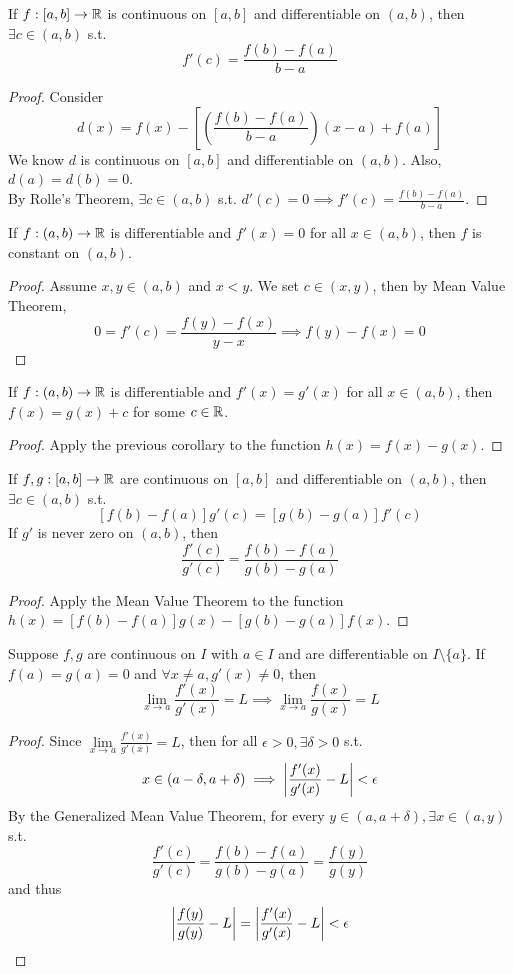 \documentclass[11pt]{article}
\begin{document}
 If $f: [a,b] \rightarrow \mathbb{R}$ is continuous on $[a,b]$ and differentiable on $(a,b)$, then $\exists c \in (a,b)$ s.t.
$$f'(c) = \frac{f(b) - f(a)}{b-a}$$
\begin{proof}
	Consider 
	$$d(x) = f(x) - \left[ \left(\frac{f(b) - f(a)}{b-a}\right) (x-a) + f(a) \right]$$
	We know $d$ is continuous on $[a,b]$ and differentiable on $(a,b)$. Also, $d(a) = d(b) = 0$. \\
	By Rolle's Theorem, $\exists c \in (a,b)$ s.t. $d'(c) = 0 \implies f'(c) = \frac{f(b) - f(a)}{b-a}$.
\end{proof}

\corollary If $f: (a,b) \rightarrow \mathbb{R}$ is differentiable and $f'(x) = 0$ for all $x \in (a,b)$, then $f$ is constant on $(a,b)$.
\begin{proof}
	Assume $x, y \in (a,b)$ and $x < y$. We set $c \in (x,y)$, then by Mean Value Theorem,
	$$0 = f'(c) = \frac{f(y) - f(x)}{y-x} \implies f(y) - f(x) = 0$$
\end{proof}
	
\corollary If $f: (a,b) \rightarrow \mathbb{R}$ is differentiable and $f'(x) = g'(x)$ for all $x \in (a,b)$, then $f(x) = g(x) + c$ for some $c \in \mathbb{R}$.
\begin{proof}
	Apply the previous corollary to the function $h(x) = f(x) - g(x)$.
\end{proof}

 If $f, g: [a,b] \rightarrow \mathbb{R}$ are continuous on $[a,b]$ and differentiable on $(a,b)$, then $\exists c \in (a,b)$ s.t.
$$[f(b) - f(a)]g'(c) = [g(b) - g(a)]f'(c)$$
If $g'$ is never zero on $(a,b)$, then
$$\frac{f'(c)}{g'(c)} = \frac{f(b) - f(a)}{g(b) - g(a)}$$
\begin{proof}
	Apply the Mean Value Theorem to the function $h(x) = [f(b) - f(a)]g(x) - [g(b)-g(a)]f(x)$.
\end{proof}

 Suppose $f, g$ are continuous on $I$ with $a \in I$ and are differentiable on $I \setminus \{a\}$. If $f(a) = g(a) = 0$ and $\forall x \neq a, g'(x) \neq 0$, then
$$\underset{x \rightarrow a}{\lim} \frac{f'(x)}{g'(x)} = L \implies \underset{x \rightarrow a}{\lim}\frac{f(x)}{g(x)} = L$$
\begin{proof}
	Since $\underset{x \rightarrow a}{\lim}\frac{f'(x)}{g'(x)} = L$, then for all $\epsilon > 0, \exists \delta > 0$ s.t.
	$$x \in (a - \delta, a + \delta) \implies \left \vert {\frac{f'(x)}{g'(x)} - L} \right \vert < \epsilon$$
	By the Generalized Mean Value Theorem, for every $y \in (a, a + \delta), \exists x \in (a, y)$ s.t.
	$$\frac{f'(c)}{g'(c)} = \frac{f(b) - f(a)}{g(b) - g(a)} = \frac{f(y)}{g(y)}$$
	and thus
	$$\left \vert {\frac{f(y)}{g(y)} - L} \right \vert = \left \vert {\frac{f'(x)}{g'(x)} - L} \right \vert < \epsilon$$
\end{proof}
\end{document}
